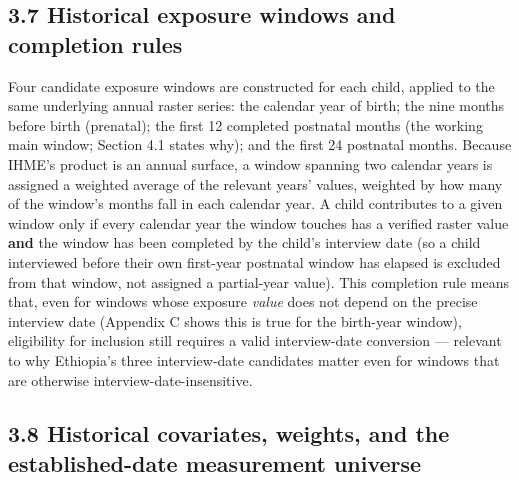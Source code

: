 \subsection*{3.7 Historical exposure windows and completion rules}

Four candidate exposure windows are constructed for each child, applied to the same underlying annual raster series: the calendar year of birth; the nine months before birth (prenatal); the first 12 completed postnatal months (the working main window; Section 4.1 states why); and the first 24 postnatal months. Because IHME's product is an annual surface, a window spanning two calendar years is assigned a weighted average of the relevant years' values, weighted by how many of the window's months fall in each calendar year. A child contributes to a given window only if every calendar year the window touches has a verified raster value \textbf{and} the window has been completed by the child's interview date (so a child interviewed before their own first-year postnatal window has elapsed is excluded from that window, not assigned a partial-year value). This completion rule means that, even for windows whose exposure \textit{value} does not depend on the precise interview date (Appendix C shows this is true for the birth-year window), eligibility for inclusion still requires a valid interview-date conversion --- relevant to why Ethiopia's three interview-date candidates matter even for windows that are otherwise interview-date-insensitive.

\subsection*{3.8 Historical covariates, weights, and the established-date measurement universe}

